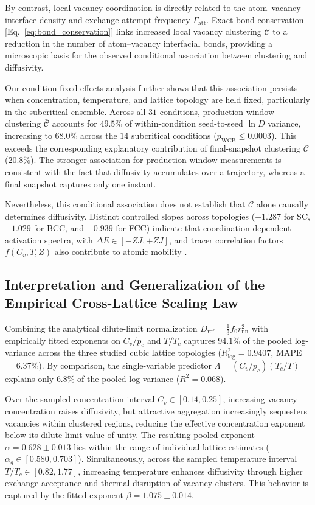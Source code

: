 \documentclass[aps,pre,reprint,superscriptaddress,amsmath,amssymb,floatfix]{revtex4-2}
\begin{document}
By contrast, local vacancy coordination is directly related to the atom--vacancy interface density and exchange attempt frequency $\Gamma_{\mathrm{att}}$. Exact bond conservation [Eq.~\eqref{eq:bond_conservation}] links increased local vacancy clustering $\mathcal{C}$ to a reduction in the number of atom--vacancy interfacial bonds, providing a microscopic basis for the observed conditional association between clustering and diffusivity.

Our condition-fixed-effects analysis further shows that this association persists when concentration, temperature, and lattice topology are held fixed, particularly in the subcritical ensemble. Across all $31$ conditions, production-window clustering $\bar{\mathcal{C}}$ accounts for $49.5\%$ of within-condition seed-to-seed $\ln D$ variance, increasing to $68.0\%$ across the $14$ subcritical conditions ($p_{\mathrm{WCB}}\leq0.0003$). This exceeds the corresponding explanatory contribution of final-snapshot clustering $\mathcal{C}$ ($20.8\%$). The stronger association for production-window measurements is consistent with the fact that diffusivity accumulates over a trajectory, whereas a final snapshot captures only one instant.

Nevertheless, this conditional association does not establish that $\bar{\mathcal{C}}$ alone causally determines diffusivity. Distinct controlled slopes across topologies ($-1.287$ for SC, $-1.029$ for BCC, and $-0.939$ for FCC) indicate that coordination-dependent activation spectra, with $\Delta E\in[-ZJ,+ZJ]$, and tracer correlation factors $f(C_v,T,Z)$ also contribute to atomic mobility \cite{Kehr1984,Kehr1989}.

\subsection{Interpretation and Generalization of the Empirical Cross-Lattice Scaling Law}
\label{sec:scaling_interpretation}

Combining the analytical dilute-limit normalization $D_{\mathrm{ref}}=\frac{1}{3}f_0r_{\mathrm{nn}}^2$ with empirically fitted exponents on $C_v/p_c$ and $T/T_c$ captures $94.1\%$ of the pooled log-variance across the three studied cubic lattice topologies ($R^2_{\log}=0.9407$, MAPE $=6.37\%$). By comparison, the single-variable predictor $\Lambda=(C_v/p_c)(T_c/T)$ explains only $6.8\%$ of the pooled log-variance ($R^2=0.068$).

Over the sampled concentration interval $C_v\in[0.14,0.25]$, increasing vacancy concentration raises diffusivity, but attractive aggregation increasingly sequesters vacancies within clustered regions, reducing the effective concentration exponent below its dilute-limit value of unity. The resulting pooled exponent $\alpha=0.628\pm0.013$ lies within the range of individual lattice estimates ($\alpha_g\in[0.580,0.703]$). Simultaneously, across the sampled temperature interval $T/T_c\in[0.82,1.77]$, increasing temperature enhances diffusivity through higher exchange acceptance and thermal disruption of vacancy clusters. This behavior is captured by the fitted exponent $\beta=1.075\pm0.014$.
\end{document}
